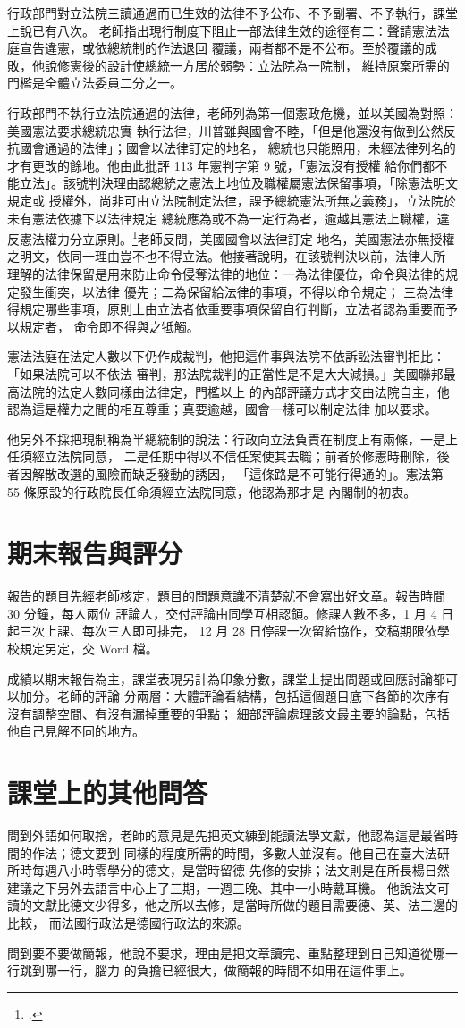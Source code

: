 行政部門對立法院三讀通過而已生效的法律不予公布、不予副署、不予執行，課堂上說已有八次。
老師指出現行制度下阻止一部法律生效的途徑有二：聲請憲法法庭宣告違憲，或依總統制的作法退回
覆議，兩者都不是不公布。至於覆議的成敗，他說修憲後的設計使總統一方居於弱勢：立法院為一院制，
維持原案所需的門檻是全體立法委員二分之一。

行政部門不執行立法院通過的法律，老師列為第一個憲政危機，並以美國為對照：美國憲法要求總統忠實
執行法律，川普雖與國會不睦，「但是他還沒有做到公然反抗國會通過的法律」；國會以法律訂定的地名，
總統也只能照用，未經法律列名的才有更改的餘地。他由此批評 113 年憲判字第 9 號，「憲法沒有授權
給你們都不能立法」。該號判決理由認總統之憲法上地位及職權屬憲法保留事項，「除憲法明文規定或
授權外，尚非可由立法院制定法律，課予總統憲法所無之義務」，立法院於未有憲法依據下以法律規定
總統應為或不為一定行為者，逾越其憲法上職權，違反憲法權力分立原則。\footcite[理由第 81 段；另見第 91 段，第 116 段就行政首長同旨]{ccj113-9}老師反問，美國國會以法律訂定
地名，美國憲法亦無授權之明文，依同一理由豈不也不得立法。他接著說明，在該號判決以前，法律人所
理解的法律保留是用來防止命令侵奪法律的地位：一為法律優位，命令與法律的規定發生衝突，以法律
優先；二為保留給法律的事項，不得以命令規定；
三為法律得規定哪些事項，原則上由立法者依重要事項保留自行判斷，立法者認為重要而予以規定者，
命令即不得與之牴觸。

憲法法庭在法定人數以下仍作成裁判，他把這件事與法院不依訴訟法審判相比：「如果法院可以不依法
審判，那法院裁判的正當性是不是大大減損。」美國聯邦最高法院的法定人數同樣由法律定，門檻以上
的內部評議方式才交由法院自主，他認為這是權力之間的相互尊重；真要逾越，國會一樣可以制定法律
加以要求。

他另外不採把現制稱為半總統制的說法：行政向立法負責在制度上有兩條，一是上任須經立法院同意，
二是任期中得以不信任案使其去職；前者於修憲時刪除，後者因解散改選的風險而缺乏發動的誘因，
「這條路是不可能行得通的」。憲法第 55 條原設的行政院長任命須經立法院同意，他認為那才是
內閣制的初衷。

\section{期末報告與評分}

報告的題目先經老師核定，題目的問題意識不清楚就不會寫出好文章。報告時間 30 分鐘，每人兩位
評論人，交付評論由同學互相認領。修課人數不多，1 月 4 日起三次上課、每次三人即可排完，
12 月 28 日停課一次留給協作，交稿期限依學校規定另定，交 Word 檔。

成績以期末報告為主，課堂表現另計為印象分數，課堂上提出問題或回應討論都可以加分。老師的評論
分兩層：大體評論看結構，包括這個題目底下各節的次序有沒有調整空間、有沒有漏掉重要的爭點；
細部評論處理該文最主要的論點，包括他自己見解不同的地方。

\section{課堂上的其他問答}

問到外語如何取捨，老師的意見是先把英文練到能讀法學文獻，他認為這是最省時間的作法；德文要到
同樣的程度所需的時間，多數人並沒有。他自己在臺大法研所時每週八小時零學分的德文，是當時留德
先修的安排；法文則是在所長楊日然建議之下另外去語言中心上了三期，一週三晚、其中一小時戴耳機。
他說法文可讀的文獻比德文少得多，他之所以去修，是當時所做的題目需要德、英、法三邊的比較，
而法國行政法是德國行政法的來源。

問到要不要做簡報，他說不要求，理由是把文章讀完、重點整理到自己知道從哪一行跳到哪一行，腦力
的負擔已經很大，做簡報的時間不如用在這件事上。
